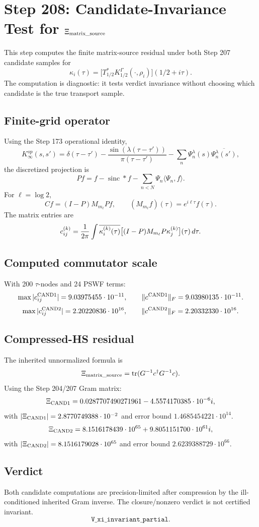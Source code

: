 \documentclass[11pt]{article}
\begin{document}
\section*{Step 208: Candidate-Invariance Test for \(\Xi_{\rm matrix\_source}\)}

This step computes the finite matrix-source residual under both Step 207
candidate samples for
\[
  \kappa_i(\tau)=\bigl[T_{1/2}^*K_{1/2}^{\Gamma}(\cdot,\rho_i)\bigr](1/2+i\tau).
\]
The computation is diagnostic: it tests verdict invariance without choosing
which candidate is the true transport sample.

\subsection*{Finite-grid operator}

Using the Step 173 operational identity,
\[
K_\infty^{op}(s,s')=\delta(\tau-\tau')
-\frac{\sin(\lambda(\tau-\tau'))}{\pi(\tau-\tau')}
-\sum_n\Psi_n^\lambda(s)\overline{\Psi_n^\lambda(s')},
\]
the discretized projection is
\[
  Pf=f-\operatorname{sinc}*f-\sum_{n<N}\Psi_n\langle \Psi_n,f\rangle .
\]
For \(\ell=\log 2\),
\[
  C f=(I-P)M_{m_\ell}Pf,\qquad
  (M_{m_\ell}f)(\tau)=e^{i\ell\tau}f(\tau).
\]
The matrix entries are
\[
  c_{ij}^{(k)}
  ={1\over 2\pi}\int
  \overline{\kappa_i^{(k)}(\tau)}
  \bigl[(I-P)M_{m_\ell}P\kappa_j^{(k)}\bigr](\tau)\,d\tau.
\]

\subsection*{Computed commutator scale}

With 200 \(\tau\)-nodes and 24 PSWF terms:
\[
\max |c_{ij}^{\rm CAND1}|=9.03975455\cdot10^{-11},\qquad
\|c^{\rm CAND1}\|_F=9.03980135\cdot10^{-11}.
\]
\[
\max |c_{ij}^{\rm CAND2}|=2.20220836\cdot10^{16},\qquad
\|c^{\rm CAND2}\|_F=2.20332330\cdot10^{16}.
\]

\subsection*{Compressed-HS residual}

The inherited unnormalized formula is
\[
  \Xi_{\rm matrix\_source}
  =\operatorname{tr}(G^{-1}c^\dagger G^{-1}c).
\]
Using the Step 204/207 Gram matrix:
\[
\Xi_{\rm CAND1}
=0.0287707490271961-4.5574170385\cdot10^{-6}i,
\]
with \(|\Xi_{\rm CAND1}|=2.8770749388\cdot10^{-2}\) and error bound
\(1.4685454221\cdot10^{14}\).
\[
\Xi_{\rm CAND2}
=8.1516178439\cdot10^{65}+9.8051151700\cdot10^{61}i,
\]
with \(|\Xi_{\rm CAND2}|=8.1516179028\cdot10^{65}\) and error bound
\(2.6239388729\cdot10^{66}\).

\subsection*{Verdict}

Both candidate computations are precision-limited after compression by the
ill-conditioned inherited Gram inverse.  The closure/nonzero verdict is not
certified invariant.
\[
  \boxed{\texttt{V\_xi\_invariant\_partial}.}
\]
\end{document}
